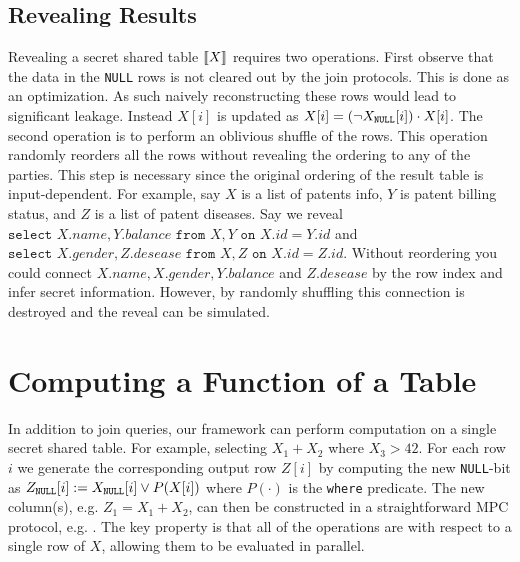 \subsection{Revealing Results}

Revealing a secret shared table $\llbracket X\rrbracket$ requires two operations. First observe that the data in the \texttt{NULL} rows is not cleared out by the join protocols. This is done as an optimization. As such naively reconstructing these rows would lead to significant leakage. Instead $X[i]$  is updated as $X[i]=(\neg X_\texttt{NULL}[i])\cdot X[i]$. %
The second operation is to perform an oblivious shuffle of the rows. This operation randomly reorders all the rows without revealing the ordering to any of the parties. This step is necessary since the original ordering of the result table is input-dependent. For example, say $X$ is a list of patents info, $Y$ is patent billing status, and $Z$ is a list of patent diseases. Say we reveal $\texttt{select } X.name, Y.balance \texttt{ from } X,Y \texttt{ on } X.id=Y.id$ and $\texttt{select } X.gender, Z.desease \texttt{ from } X,Z \texttt{ on } \allowbreak X.id=Z.id$. Without reordering you could connect $X.name, X.gender, Y.balance$ and $Z.desease$ by the row index and infer secret information. However, by randomly shuffling this connection is destroyed and the reveal can be simulated.




\section{Computing a Function of a Table}\label{sec:card}

In addition to join queries, our framework can perform computation on a single secret shared table. For example, selecting $X_1+X_2$  where $X_3>42$. For each row $i$ we generate the corresponding output row $Z[i]$ by computing the new \texttt{NULL}-bit as $Z_\texttt{NULL}[i] := X_\texttt{NULL}[i] \vee P(X[i])$ where $P(\cdot)$ is the \texttt{where} predicate. The new column(s), e.g. $Z_1=X_1+X_2$, can then be constructed in a straightforward MPC protocol, e.g. \cite{aby3,highthroughput}. The key property is that all of the operations are with respect to a single row of $X$, allowing them to be evaluated in parallel. 

